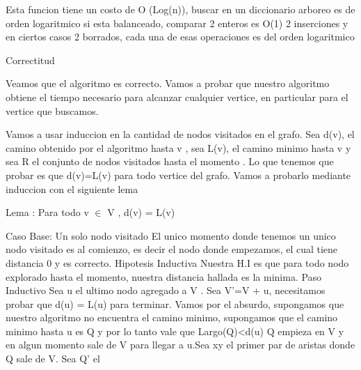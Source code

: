 Esta funcion tiene un costo de O (Log(n)), buscar en un diccionario arboreo es de orden logaritmico si esta balanceado, comparar 2 enteros es O(1) 2 inserciones
y en ciertos casos 2 borrados, cada una de esas operaciones es del orden logaritmico


Correctitud

Veamos que el algoritmo es correcto. Vamos a probar que nuestro algoritmo
obtiene el tiempo necesario para alcanzar cualquier vertice, en particular
para el vertice que buscamos.

Vamos a usar induccion en la cantidad de nodos visitados en el grafo.
Sea d(v), el camino obtenido por el algoritmo hasta v , sea L(v), el camino minimo hasta v y sea R el conjunto de nodos visitados hasta el momento . Lo que tenemos que probar es que d(v)=L(v) para todo vertice del grafo. Vamos a probarlo mediante induccion con el siguiente lema



Lema : Para todo v $\in$ V , d(v) = L(v)

Caso Base: Un solo nodo visitado
El unico momento donde tenemos un unico nodo visitado es al comienzo, es decir el nodo donde empezamos, el cual tiene distancia 0 y es correcto.
Hipotesis Inductiva
Nuestra H.I es que para todo nodo explorado hasta el momento, nuestra distancia
hallada es la minima.
Paso Inductivo
Sea u el ultimo nodo agregado a V . Sea V'=V + u, necesitamos probar que d(u) = L(u)
para terminar.
Vamos por el absurdo, supongamos que nuestro algoritmo no encuentra el camino minimo,
supongamos que el camino minimo hasta u es Q y por lo tanto vale que
Largo(Q)<d(u) 
Q empieza en V y en algun momento sale de V para llegar a u.Sea xy el primer par de aristas donde Q sale de V. Sea Q' el 

